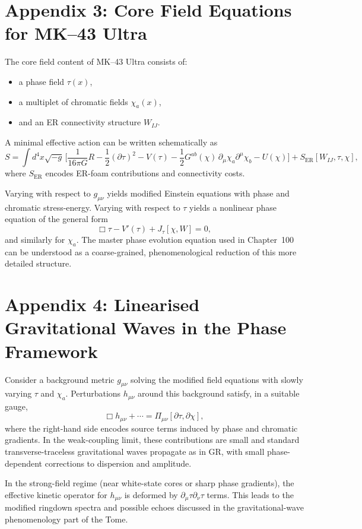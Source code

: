 \chapter{Appendix 3: Core Field Equations for MK--43 Ultra}

The core field content of MK--43 Ultra consists of:
\begin{itemize}
  \item a phase field \(\tau(x)\),
  \item a multiplet of chromatic fields \(\chi_a(x)\),
  \item and an ER connectivity structure \(W_{IJ}\).
\end{itemize}
A minimal effective action can be written schematically as
\[
S = \int d^4x \sqrt{-g}\,\Big[
  \frac{1}{16\pi G}R
  - \frac{1}{2}(\partial\tau)^2
  - V(\tau)
  - \frac{1}{2}G^{ab}(\chi)\,\partial_\mu \chi_a \partial^\mu \chi_b
  - U(\chi)
\Big] + S_{\mathrm{ER}}[W_{IJ},\tau,\chi],
\]
where \(S_{\mathrm{ER}}\) encodes ER-foam contributions and connectivity costs.

Varying with respect to \(g_{\mu\nu}\) yields modified Einstein equations with phase and chromatic stress-energy.
Varying with respect to \(\tau\) yields a nonlinear phase equation of the general form
\[
\Box \tau - V'(\tau) + J_\tau[\chi,W] = 0,
\]
and similarly for \(\chi_a\).
The master phase evolution equation used in Chapter~100 can be understood as a coarse-grained, phenomenological reduction of this more detailed structure.

\chapter{Appendix 4: Linearised Gravitational Waves in the Phase Framework}

Consider a background metric \(g_{\mu\nu}\) solving the modified field equations with slowly varying \(\tau\) and \(\chi_a\).
Perturbations \(h_{\mu\nu}\) around this background satisfy, in a suitable gauge,
\[
\Box h_{\mu\nu} + \cdots = \Pi_{\mu\nu}[\partial\tau,\partial\chi],
\]
where the right-hand side encodes source terms induced by phase and chromatic gradients.
In the weak-coupling limit, these contributions are small and standard transverse-traceless gravitational waves propagate as in GR, with small phase-dependent corrections to dispersion and amplitude.

In the strong-field regime (near white-state cores or sharp phase gradients), the effective kinetic operator for \(h_{\mu\nu}\) is deformed by \(\partial_\mu\tau\partial_\nu\tau\) terms.
This leads to the modified ringdown spectra and possible echoes discussed in the gravitational-wave phenomenology part of the Tome.

